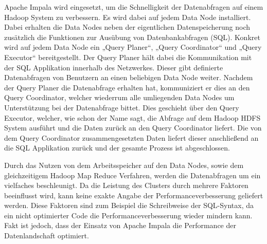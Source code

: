 Apache Impala wird eingesetzt, um die Schnelligkeit der Datenabfragen auf einem
Hadoop System zu verbessern. Es wird dabei auf jedem Data Node installiert.
Dabei erhalten die Data Nodes neben der eigentlichen Datenspeicherung noch
zusätzlich die Funktionen zur Ausübung von Datenbankabfragen (SQL). Konkret
wird auf jedem Data Node ein „Query Planer“, „Query Coordinator“ und „Query
Executor“ bereitgestellt. Der Query Planer hält dabei die Kommunikation mit der
SQL Applikation innerhalb des Netzwerkes. Dieser gibt definierte Datenabfragen
von Benutzern an einen beliebigen Data Node weiter. Nachdem der Query Planer
die Datenabfrage erhalten hat, kommuniziert er dies an den Query Coordinator,
welcher wiederrum alle umliegenden Data Nodes um Unterstützung bei der
Datenabfrage bittet. Dies geschieht über den Query Executor, welcher, wie
schon der Name sagt, die Abfrage auf dem Hadoop HDFS System ausführt und die
Daten zurück an den Query Coordinator liefert. Die von dem Query Coordinator
zusammengesetzten Daten liefert dieser anschließend an die SQL Applikation
zurück und der gesamte Prozess ist abgeschlossen.

Durch das Nutzen von dem Arbeitsspeicher auf den Data Nodes, sowie dem
gleichzeitigem Hadoop Map Reduce Verfahren, werden die Datenabfragen um ein
vielfaches beschleunigt. Da die Leistung des Clusters durch mehrere Faktoren
beeinflusst wird, kann keine exakte Angabe der Performanceverbesserung
geliefert werden. Diese Faktoren sind zum Beispiel die Schreibweise der
SQL-Syntax, da ein nicht optimierter Code die Performanceverbesserung wieder
mindern kann. Fakt ist jedoch, dass der Einsatz von Apache Impala die
Performance der Datenlandschaft optimiert.
\nl%

